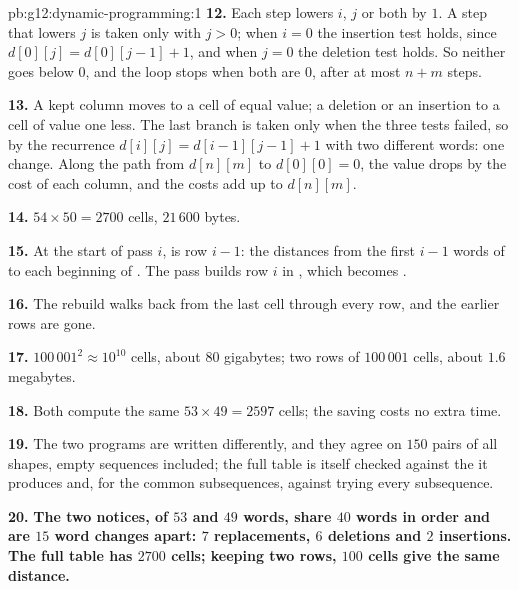 \begin{solution}{pb:g12:dynamic-programming:1}
\textbf{12.} Each step lowers $i$, $j$ or both by $1$. A step that lowers $j$ is taken only with $j > 0$; when $i = 0$
the insertion test holds, since $d[0][j] = d[0][j - 1] + 1$, and when $j = 0$ the deletion test holds. So neither goes
below $0$, and the loop stops when both are $0$, after at most $n + m$ steps.

\textbf{13.} A kept column moves to a cell of equal value; a deletion or an insertion to a cell of value one less. The
last branch is taken only when the three tests failed, so by the recurrence $d[i][j] = d[i - 1][j - 1] + 1$ with two
different words: one change. Along the path from $d[n][m]$ to $d[0][0] = 0$, the value drops by the cost of each
column, and the costs add up to $d[n][m]$.

\textbf{14.} $54 \times 50 = 2700$ cells, $21\,600$ bytes.

\textbf{15.} At the start of pass $i$,  is row $i - 1$: the distances from the first $i - 1$ words of
 to each beginning of . The pass builds row $i$ in , which becomes .

\textbf{16.} The rebuild walks back from the last cell through every row, and the earlier rows are gone.

\textbf{17.} $100\,001^2 \approx 10^{10}$ cells, about $80$ gigabytes; two rows of $100\,001$ cells, about $1.6$
megabytes.

\textbf{18.} Both compute the same $53 \times 49 = 2597$ cells; the saving costs no extra time.

\textbf{19.} The two programs are written differently, and they agree on $150$ pairs of all shapes, empty sequences
included; the full table is itself checked against the  it produces and, for the common subsequences,
against trying every subsequence.

\textbf{20.} \textbf{The two notices, of $53$ and $49$ words, share $40$ words in order and are $15$ word changes
apart: $7$ replacements, $6$ deletions and $2$ insertions. The full table has $2700$ cells; keeping two rows, $100$
cells give the same distance.}
\end{solution}

